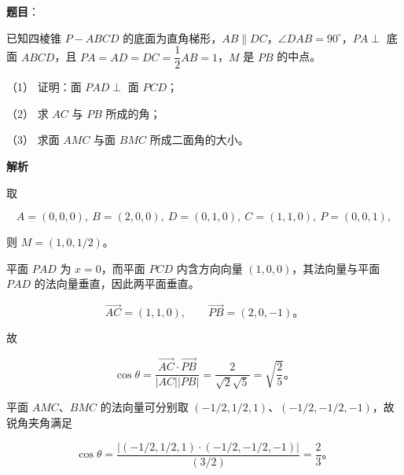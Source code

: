 \begin{answer}

\textbf{题目}：

已知四棱锥 $P-ABCD$ 的底面为直角梯形，$AB\parallel DC$，$\angle DAB=90^\circ$，$PA\perp$ 底面 $ABCD$，且 $PA=AD=DC=\dfrac12AB=1$，$M$ 是 $PB$ 的中点。
\nopagebreak[4]
\begin{center}\end{center}
\nopagebreak[4]
（1） 证明：面 $PAD\perp$ 面 $PCD$；

（2） 求 $AC$ 与 $PB$ 所成的角；

（3） 求面 $AMC$ 与面 $BMC$ 所成二面角的大小。

\textbf{解析}

取

\nopagebreak[4]
\[
A=(0,0,0),\ B=(2,0,0),\ D=(0,1,0),\ C=(1,1,0),\ P=(0,0,1),
\]

则 $M=(1,0,1/2)$。


平面 $PAD$ 为 $x=0$，而平面 $PCD$ 内含方向向量 $(1,0,0)$，其法向量与平面 $PAD$ 的法向量垂直，因此两平面垂直。


\nopagebreak[4]
\[
\overrightarrow{AC}=(1,1,0),\qquad \overrightarrow{PB}=(2,0,-1)\text{。}
\]

故

\nopagebreak[4]
\[
\cos\theta=\frac{\overrightarrow{AC}\cdot\overrightarrow{PB}}{|AC||PB|}
=\frac2{\sqrt2\sqrt5}=\sqrt{\frac25}\text{。}
\]


平面 $AMC$、$BMC$ 的法向量可分别取 $(-1/2,1/2,1)$、$(-1/2,-1/2,-1)$，故锐角夹角满足

\nopagebreak[4]
\[
\cos\theta=\frac{|(-1/2,1/2,1)\cdot(-1/2,-1/2,-1)|}{(3/2)}
=\frac23\text{。}
\]




\end{answer}
